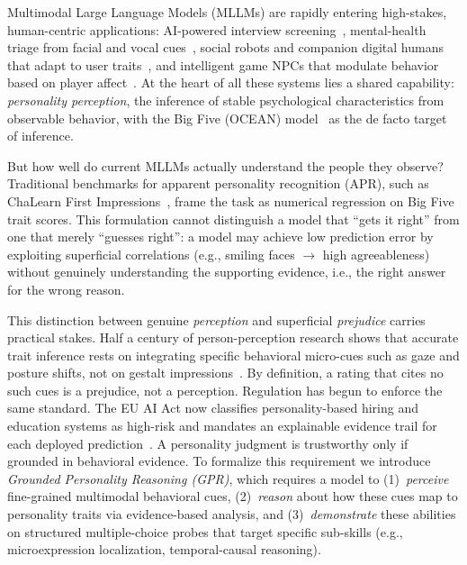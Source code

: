 \documentclass{llmxive}
\providecommand{\taskname}{Grounded Personality Reasoning}
\providecommand{\taskabbr}{GPR}
\begin{document}
Multimodal Large Language Models (MLLMs) are rapidly entering high-stakes, human-centric applications: AI-powered interview screening~\cite{naim2016automated}, mental-health triage from facial and vocal cues~\cite{gratch2014distress}, social robots and companion digital humans that adapt to user traits~\cite{tang2025robot,cai2025towards}, and intelligent game NPCs that modulate behavior based on player affect~\cite{garavaglia2022moody5}. At the heart of all these systems lies a shared capability: \emph{personality perception}, the inference of stable psychological characteristics from observable behavior, with the Big Five (OCEAN) model~\cite{john2008paradigm} as the de facto target of inference.

But how well do current MLLMs actually understand the people they observe? Traditional benchmarks for apparent personality recognition (APR), such as ChaLearn First Impressions~\cite{ponce2016chalearn,escalante2020modeling}, frame the task as numerical regression on Big Five trait scores. This formulation cannot distinguish a model that ``gets it right'' from one that merely ``guesses right'': a model may achieve low prediction error by exploiting superficial correlations (e.g., smiling faces $\rightarrow$ high agreeableness) without genuinely understanding the supporting evidence, i.e., the right answer for the wrong reason.

This distinction between genuine \emph{perception} and superficial \emph{prejudice} carries practical stakes. 
Half a century of person-perception research shows that accurate trait inference rests on integrating specific behavioral micro-cues such as gaze and posture shifts, not on gestalt impressions~\cite{funder1995accuracy,ambady1992thin,liu2021generalizing}. By definition, a rating that cites no such cues is a prejudice, not a perception. Regulation has begun to enforce the same standard. The EU AI Act now classifies personality-based hiring and education systems as high-risk and mandates an explainable evidence trail for each deployed prediction~\cite{council2024regulation}. A personality judgment is trustworthy only if grounded in behavioral evidence. To formalize this requirement we introduce \emph{\taskname{} (\taskabbr{})}, which requires a model to (1)~\emph{perceive} fine-grained multimodal behavioral cues, (2)~\emph{reason} about how these cues map to personality traits via evidence-based analysis, and (3)~\emph{demonstrate} these abilities on structured multiple-choice probes that target specific sub-skills (e.g., microexpression localization, temporal-causal reasoning).
\end{document}
